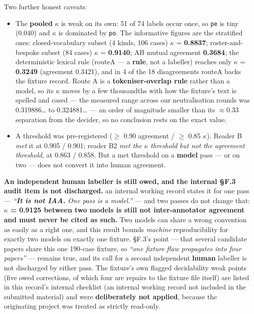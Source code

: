 \documentclass[10pt]{article}
\begin{document}
Two further honest caveats:

\begin{itemize}
\item The \textbf{pooled} $\kappa$ is weak on its own: 51 of 74 labels occur once, so \texttt{pe} is tiny (0.040) and $\kappa$ is dominated by \texttt{po}. The informative figures are the stratified ones: closed-vocabulary subset (4 kinds, 106 cases) $\kappa$ = \textbf{0.8837}; roster-and-bespoke subset (84 cases) $\kappa$ = \textbf{0.9140}; AB mutual agreement \textbf{0.3684}; the deterministic lexical rule (routeA --- a \textbf{rule}, not a labeller) reaches only $\kappa$ = \textbf{0.3249} (agreement 0.3421), and in 4 of the 18 disagreements routeA backs the fixture record. Route A is a \textbf{tokeniser-overlap rule} rather than a model, so its $\kappa$ moves by a few thousandths with how the fixture's text is spelled and cased --- the measured range across our neutralisation rounds was 0.319886\ldots{} to 0.324881\ldots{} --- an order of magnitude smaller than its $\approx$0.33 separation from the decider, so no conclusion rests on the exact value.
\item A threshold was pre-registered ($\ge$ 0.90 agreement / $\ge$ 0.85 $\kappa$). Reader B \emph{met} it at 0.905 / 0.901; reader B2 \emph{met the $\kappa$ threshold but not the agreement threshold}, at 0.863 / 0.858. But a met threshold on a \textbf{model} pass --- or on two --- does not convert it into human agreement.
\end{itemize}

\textbf{An independent human labeller is still owed, and the internal \S{}F.3 audit item is not discharged.} an internal working record states it for one pass --- \emph{``\textbf{It is not IAA.} One pass is a model.''} --- and two passes do not change that: \textbf{$\kappa$ = 0.9125 between two models is still not inter-annotator agreement and must never be cited as such.} Two models can share a wrong convention as easily as a right one, and this result bounds \emph{machine} reproducibility for exactly two models on exactly one fixture. \S{}F.3's point --- that several candidate papers share this one 190-case fixture, so \emph{``one fixture flaw propagates into four papers''} --- remains true, and its call for a second independent \textbf{human} labeller is not discharged by either pass. The fixture's own flagged decidability weak points (five owed corrections, of which four are repairs to the fixture file itself) are listed in this record's internal checklist (an internal working record not included in the submitted material) and were \textbf{deliberately not applied}, because the originating project was treated as strictly read-only.
\end{document}
